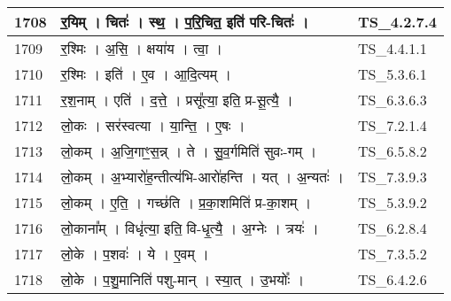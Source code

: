 \documentclass[17pt]{extarticle}
\begin{document}
\begin{longtable}{||p{0.4in}||p{4.9in}||p{0.9in}||}
    \hline
        
    1708 & र॒यिम्   ।   चितः॑   ।   स्थ॒   ।   प॒रि॒चित॒ इति॑ परि{-}चितः॑   ।    & TS\_4.2.7.4       \\
    
    \hline
        
    1709 & र॒श्मिः   ।   अ॒सि॒   ।   क्षया॑य   ।   त्वा॒   ।    & TS\_4.4.1.1       \\
    
    \hline
        
    1710 & र॒श्मिः   ।   इति॑   ।   ए॒व   ।   आ॒दि॒त्यम्   ।    & TS\_5.3.6.1       \\
    
    \hline
        
    1711 & र॒श॒नाम्   ।   एति॑   ।   द॒त्ते॒   ।   प्रसू᳚त्या॒ इति॒ प्र{-}सू॒त्यै॒   ।    & TS\_6.3.6.3       \\
    
    \hline
        
    1712 & लो॒कः   ।   सर॑स्वत्या   ।   या॒न्ति॒   ।   ए॒षः   ।    & TS\_7.2.1.4       \\
    
    \hline
        
    1713 & लो॒कम्   ।   अ॒जि॒गाꣳ॒॒स॒न्न्   ।   ते   ।   सु॒व॒र्गमिति॑ सुवः{-}गम्   ।    & TS\_6.5.8.2       \\
    
    \hline
        
    1714 & लो॒कम्   ।   अ॒भ्यारो॑ह॒न्तीत्य॑भि{-}आरो॑हन्ति   ।   यत्   ।   अ॒न्यतः॑   ।    & TS\_7.3.9.3       \\
    
    \hline
        
    1715 & लो॒कम्   ।   ए॒ति॒   ।   गच्छ॑ति   ।   प्र॒का॒शमिति॑ प्र{-}का॒शम्   ।    & TS\_5.3.9.2       \\
    
    \hline
        
    1716 & लो॒काना᳚म्   ।   विधृ॑त्या॒ इति॒ वि{-}धृ॒त्यै॒   ।   अ॒ग्नेः   ।   त्रयः॑   ।    & TS\_6.2.8.4       \\
    
    \hline
        
    1717 & लो॒के   ।   प॒शवः॑   ।   ये   ।   ए॒वम्   ।    & TS\_7.3.5.2       \\
    
    \hline
        
    1718 & लो॒के   ।   प॒शु॒मानिति॑ पशु{-}मान्   ।   स्या॒त्   ।   उ॒भयोः᳚   ।    & TS\_6.4.2.6       \\
    

\end{longtable}
\end{document}

